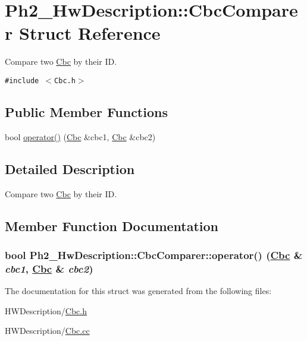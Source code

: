 \hypertarget{struct_ph2___hw_description_1_1_cbc_comparer}{
\section{Ph2\_\-Hw\-Description::Cbc\-Comparer Struct Reference}
\label{struct_ph2___hw_description_1_1_cbc_comparer}
}
Compare two \hyperlink{class_ph2___hw_description_1_1_cbc}{Cbc} by their ID.  


{\tt \#include $<$Cbc.h$>$}

\subsection*{Public Member Functions}
\begin{CompactItemize}
\item 
bool \hyperlink{struct_ph2___hw_description_1_1_cbc_comparer_f83d2c46bcdcb36adcd0ae91f929942a}{operator()} (\hyperlink{class_ph2___hw_description_1_1_cbc}{Cbc} \&cbc1, \hyperlink{class_ph2___hw_description_1_1_cbc}{Cbc} \&cbc2)
\end{CompactItemize}


\subsection{Detailed Description}
Compare two \hyperlink{class_ph2___hw_description_1_1_cbc}{Cbc} by their ID. 



\subsection{Member Function Documentation}
\hypertarget{struct_ph2___hw_description_1_1_cbc_comparer_f83d2c46bcdcb36adcd0ae91f929942a}{
\subsubsection[operator()]{\setlength{\rightskip}{0pt plus 5cm}bool Ph2\_\-Hw\-Description::Cbc\-Comparer::operator() (\hyperlink{class_ph2___hw_description_1_1_cbc}{Cbc} \& {\em cbc1}, \hyperlink{class_ph2___hw_description_1_1_cbc}{Cbc} \& {\em cbc2})}}
\label{struct_ph2___hw_description_1_1_cbc_comparer_f83d2c46bcdcb36adcd0ae91f929942a}




The documentation for this struct was generated from the following files:\begin{CompactItemize}
\item 
HWDescription/\hyperlink{_cbc_8h}{Cbc.h}\item 
HWDescription/\hyperlink{_cbc_8cc}{Cbc.cc}\end{CompactItemize}
